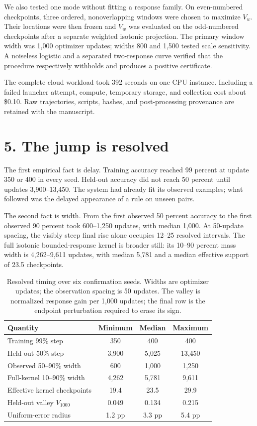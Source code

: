 \documentclass[10pt]{article}
\theoremstyle{compact}
\begin{document}
We also tested one mode without fitting a response family. On even-numbered
checkpoints, three ordered, nonoverlapping windows were chosen to maximize
\(V_w\). Their locations were then frozen and \(V_w\) was evaluated on the
odd-numbered checkpoints after a separate weighted isotonic projection. The
primary window width was 1,000 optimizer updates; widths 800 and 1,500 tested
scale sensitivity. A noiseless logistic and a separated two-response curve
verified that the procedure respectively withholds and produces a positive
certificate.

The complete cloud workload took 392 seconds on one CPU instance. Including a
failed launcher attempt, compute, temporary storage, and collection cost about
\$0.10. Raw trajectories, scripts, hashes, and post-processing provenance are
retained with the manuscript.

\section*{5. The jump is resolved}

The first empirical fact is delay. Training accuracy reached 99 percent at
update 350 or 400 in every seed. Held-out accuracy did not reach 50 percent
until updates 3,900--13,450. The system had already fit its observed examples;
what followed was the delayed appearance of a rule on unseen pairs.

The second fact is width. From the first observed 50 percent accuracy to the
first observed 90 percent took 600--1,250 updates, with median 1,000. At
50-update spacing, the visibly steep final rise alone occupies 12--25 resolved
intervals. The full isotonic bounded-response kernel is broader still: its
10--90 percent mass width is 4,262--9,611 updates, with median 5,781 and a
median effective support of 23.5 checkpoints.

\begin{table}[H]
\centering
\small
\begin{tabular}{lccc}
\toprule
Quantity & Minimum & Median & Maximum\\
\midrule
Training 99\% step & 350 & 400 & 400\\
Held-out 50\% step & 3,900 & 5,025 & 13,450\\
Observed 50--90\% width & 600 & 1,000 & 1,250\\
Full-kernel 10--90\% width & 4,262 & 5,781 & 9,611\\
Effective kernel checkpoints & 19.4 & 23.5 & 29.9\\
Held-out valley \(V_{1000}\) & 0.049 & 0.134 & 0.215\\
Uniform-error radius & 1.2 pp & 3.3 pp & 5.4 pp\\
\bottomrule
\end{tabular}
\caption{Resolved timing over six confirmation seeds. Widths are optimizer
updates; the observation spacing is 50 updates. The valley is normalized
response gain per 1,000 updates; the final row is the endpoint perturbation
required to erase its sign.}
\label{tab:timing}
\end{table}
\end{document}
